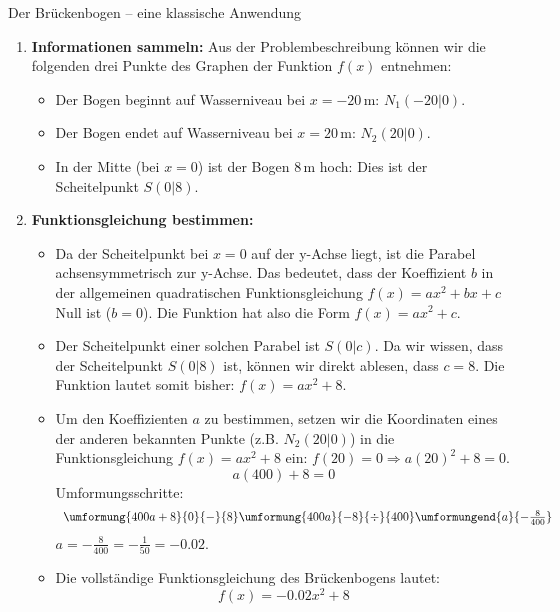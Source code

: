 \begin{loesungsumgebung}{Der Brückenbogen – eine klassische Anwendung}

\begin{enumerate}[label=(\alph*)]
    \item \textbf{Informationen sammeln:}
    Aus der Problembeschreibung können wir die folgenden drei Punkte des Graphen der Funktion $f(x)$ entnehmen:
    \begin{itemize}
        \item Der Bogen beginnt auf Wasserniveau bei $x=-20\,$m: $N_1(-20|0)$.
        \item Der Bogen endet auf Wasserniveau bei $x=20\,$m: $N_2(20|0)$.
        \item In der Mitte (bei $x=0$) ist der Bogen $8\,$m hoch: Dies ist der Scheitelpunkt $S(0|8)$.
    \end{itemize}

    \item \textbf{Funktionsgleichung bestimmen:}
    \begin{itemize}
        \item Da der Scheitelpunkt bei $x=0$ auf der y-Achse liegt, ist die Parabel achsensymmetrisch zur y-Achse. Das bedeutet, dass der Koeffizient $b$ in der allgemeinen quadratischen Funktionsgleichung $f(x) = ax^2+bx+c$ Null ist ($b=0$). Die Funktion hat also die Form $f(x) = ax^2+c$.
        \item Der Scheitelpunkt einer solchen Parabel ist $S(0|c)$. Da wir wissen, dass der Scheitelpunkt $S(0|8)$ ist, können wir direkt ablesen, dass $c=8$.
        Die Funktion lautet somit bisher: $f(x) = ax^2+8$.
        \item Um den Koeffizienten $a$ zu bestimmen, setzen wir die Koordinaten eines der anderen bekannten Punkte (z.B. $N_2(20|0)$) in die Funktionsgleichung $f(x) = ax^2+8$ ein:
        $f(20) = 0 \Rightarrow a(20)^2+8 = 0$.
        $$a(400)+8 = 0$$
        Umformungsschritte:
        $$
        \begin{array}{r c l c l}
        \umformung{400a + 8}{0}{-}{8}
        \umformung{400a}{-8}{\div}{400}
        \umformungend{a}{-\frac{8}{400}}
        \end{array}
        $$
        $a = -\frac{8}{400} = -\frac{1}{50} = -0.02$.
        \item Die vollständige Funktionsgleichung des Brückenbogens lautet:
        $$f(x) = -0.02x^2 + 8$$
    \end{itemize}


\end{enumerate}
\end{loesungsumgebung}
